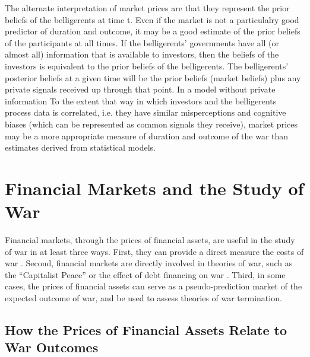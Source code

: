 The alternate interpretation of market prices are that they represent
the prior beliefs of the belligerents at time t. Even if the market is
not a particulalry good predictor of duration and outcome, it may be a
good estimate of the prior beliefs of the participants at all times.
If the belligerents' governments have all (or almost all) information
that is available to investors, then the beliefs of the investors is
equivalent to the prior beliefs of the belligerents. The belligerents'
posterior beliefs at a given time will be the prior beliefs (market
beliefs) plus any private signals received up through that point. In a
model without private information
To the extent that way in which investors and the belligerents process
data is correlated, i.e. they have similar misperceptions and
cognitive biases (which can be represented as common signals they
receive), market prices may be a more appropriate measure of duration
and outcome of the war than estimates derived from statistical models.


\section{Financial Markets and the Study of War}
\label{bonds_battles:sec:barg-theory-war}

Financial markets, through the prices of financial assets, are useful in the study of war in at least three ways.
First, they can provide a direct measure the costs of war \parencite{GuidolinLaFerrara2010}.
Second, financial markets are directly involved in theories of war, such as the ``Capitalist Peace'' \parencites{Gartzke2007}{DafoeKelsey2014a} or the effect of debt financing on war \parencite{Slantchev2012a}.
Third, in some cases, the prices of financial assets can serve as a pseudo-prediction market of the expected outcome of war, and be used to assess theories of war termination.

\subsection{How the Prices of Financial Assets Relate to War Outcomes}
\label{bonds_battles:sec:how-prices-financial}

